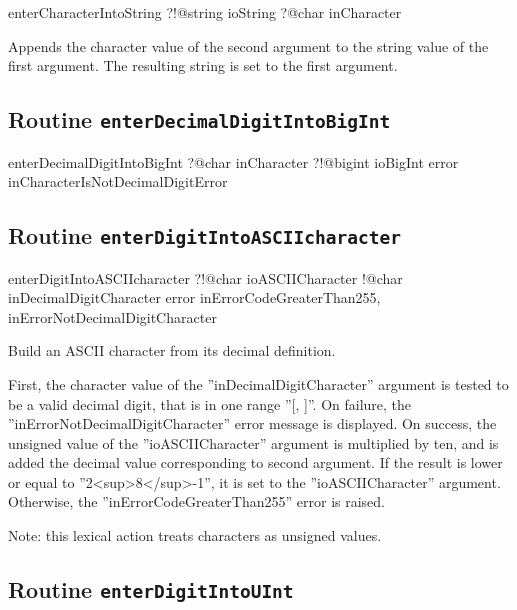 \begin{galgas4}
enterCharacterIntoString ?!@string ioString
                         ?@char inCharacter
\end{galgas4}

Appends the character value of the second argument to the string value of the first argument. The resulting string is set to the first argument.

\subsection{Routine \texttt{enterDecimalDigitIntoBigInt}}

\begin{galgas4}
enterDecimalDigitIntoBigInt ?@char inCharacter
                            ?!@bigint ioBigInt
                            error inCharacterIsNotDecimalDigitError
\end{galgas4}

\subsection{Routine \texttt{enterDigitIntoASCIIcharacter}}

\begin{galgas4}
enterDigitIntoASCIIcharacter ?!@char ioASCIICharacter
                             !@char inDecimalDigitCharacter
                             error inErrorCodeGreaterThan255,
                                   inErrorNotDecimalDigitCharacter
\end{galgas4}

Build an ASCII character from its decimal definition.

First, the character value of the ''inDecimalDigitCharacter'' argument is tested to be a valid decimal digit, that is in one range ''[\textquotesingle, \textquotesingle]''. On failure, the ''inErrorNotDecimalDigitCharacter'' error message is displayed. On success, the unsigned value of the ''ioASCIICharacter'' argument is multiplied by ten, and is added the decimal value corresponding to second argument. If the result is lower or equal to ''2<sup>8</sup>-1'', it is set to the ''ioASCIICharacter'' argument. Otherwise, the ''inErrorCodeGreaterThan255'' error is raised.

Note: this lexical action treats characters as unsigned values.

\subsection{Routine \texttt{enterDigitIntoUInt}}

